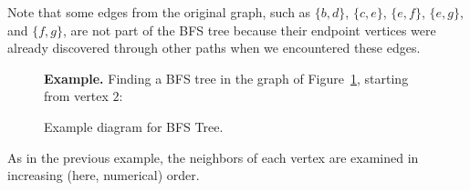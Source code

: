 \documentclass{article}
\theoremstyle{definition}
\begin{document}
Note that some edges from the original graph, such as $\{b, d\}$, $\{c, e\}$, $\{e, f\}$, 
$\{e, g\}$, and $\{f, g\}$, are not part of the BFS tree because their endpoint vertices 
were already discovered through other paths when we encountered these edges.

\begin{figure}[h]
\noindent\textbf{Example.}
Finding a BFS tree in the graph of Figure~\ref{fig:graph-example2}, starting from vertex $2$:

\centering
{}
\caption{Example diagram for BFS Tree.}
\label{fig:graph-example2}
\end{figure}
\pagebreak
\noindent As in the previous example, the neighbors of each vertex are examined in increasing (here, numerical) order.
\end{document}
